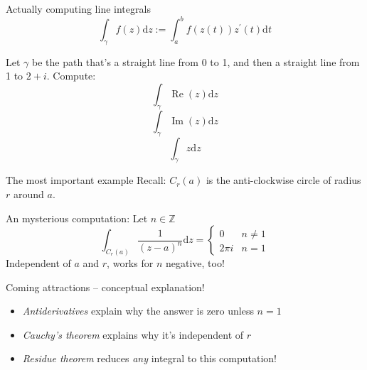 \documentclass{beamer}
\newcommand{\Z}{\mathbb{Z}}
\DeclareMathOperator{\Real}{Re}
\DeclareMathOperator{\Imag}{Im}
\begin{document}
\begin{frame}{Actually computing line integrals}
$$\int_\gamma f(z)\text{d}z := \int_a^b f(z(t))z^\prime(t)\text{d}t$$
\begin{example}
Let $\gamma$ be the path that's a straight line from 0 to 1, and then a straight line from 1 to $2+i$.  Compute:
$$\int_\gamma \Real(z)\text{d}z$$
$$\int_\gamma \Imag(z)\text{d}z$$
$$\int_\gamma z\text{d}z$$
\end{example}
\end{frame}

\begin{frame}{The most important example}
Recall: $C_r(a)$ is the anti-clockwise circle of radius $r$ around $a$.  
\begin{block}{An mysterious computation:}
Let $n\in\Z$
$$\int_{C_r(a)}\frac{1}{(z-a)^n}\text{d}z=\begin{cases} 0 & n\neq 1 \\ 2\pi i & n=1\end{cases}$$
Independent of $a$ and $r$, works for $n$ negative, too!
\end{block}
\begin{block}{Coming attractions -- conceptual explanation!}
\begin{itemize}
    \item \emph{Antiderivatives} explain why the answer is zero unless $n=1$
    \item \emph{Cauchy's theorem} explains why it's independent of $r$
    \item \emph{Residue theorem} reduces \emph{any} integral to this computation!
\end{itemize}

\end{block}
\end{frame}
\end{document}

